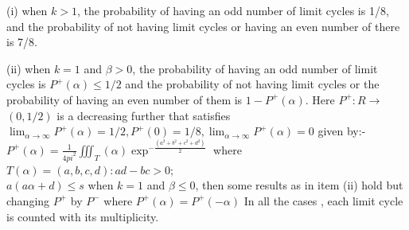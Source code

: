 \documentclass[]{article}
\begin{document}
(i) when $k>1$, the probability of having an odd number of limit cycles is 1/8, and the probability of not having limit cycles or having an even number of there is 7/8.

(ii) when $k=1$ and $\beta>0$, the probability of having an odd number of limit cycles is $P^+(\alpha)\leq1/2$ and the probability of not having limit cycles or the probability of having an even number of them is $1-P^+(\alpha)$. Here $ P^+ :{R} \rightarrow$ $(0,1/2)$ is a decreasing further that satisfies 
$\lim_{\alpha\to\infty }P^+(\alpha)=1/2,P^+(0)=1/8,\lim_{\alpha\to\infty }P^+(\alpha)=0 $
given by:-
\\$P^+(\alpha)=\frac{1}{4pi^2}\iiint_T(\alpha) \exp^{-\frac{(a^2+b^2+c^2+d^2)}{2}} $
where \\$T(\alpha)={(a,b,c,d):ad-bc>0;}$ \\${a(a\alpha+d)\leq s}$
when $k=1$ and $\beta \leq 0$, then some results as in item (ii) hold but changing $P^+$ by $P^-$ where $P^+(\alpha)=P^+(-\alpha)$
In all the cases , each limit cycle is counted with its multiplicity.
\newpage
\end{document}
